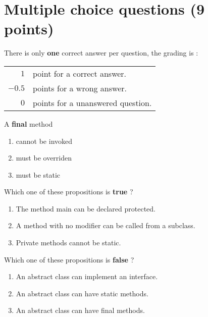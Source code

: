 \documentclass[correction]{exercices}
\begin{document}

\section{Multiple choice questions (9 points)}

  There is only \textbf{one} correct answer per question, the grading is :

  \begin{tabular}{rl}
  $1$    &point for a correct answer.\\
  $-0.5$ &points for a wrong answer.\\
  $0$    &points for a unanswered question.\\
  \end{tabular}
\vspace{1cm}

\begin{question}
A \textbf{final} method
\begin{multicols}{2}
\begin{enumerate}
\item cannot be invoked
\item must be overriden
\item must be static
\end{enumerate}
\end{multicols}
\end{question}

\begin{question}
Which one of these propositions is \textbf{true} ?
\begin{enumerate}
\item The method main can be declared protected.
\item A method with no modifier can be called from a subclass.
\item Private methods cannot be static.
\end{enumerate}
\end{question}

\begin{question}
Which one of these propositions is \textbf{false} ?
\begin{enumerate}
\item An abstract class can implement an interface.
\item An abstract class can have static methods.
\item An abstract class can have final methods.
\end{enumerate}
\end{question}
\end{document}
